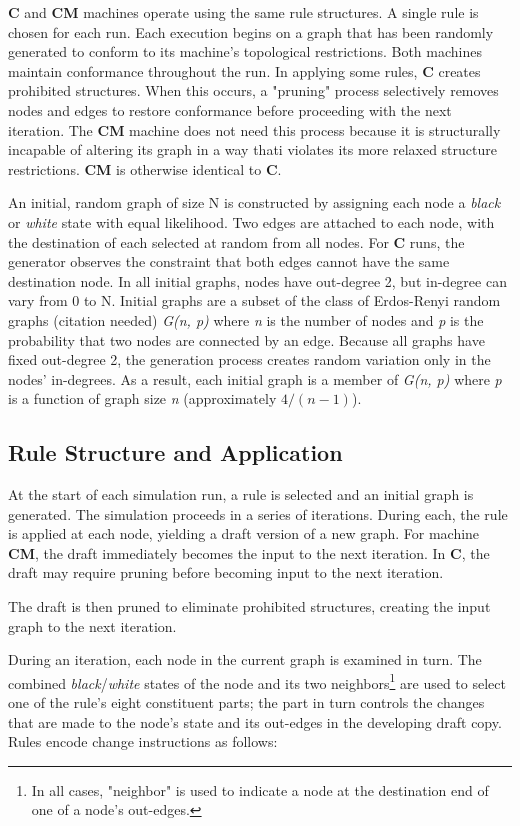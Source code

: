 \documentclass{tufte-handout}
\begin{document}
\textbf{C} and \textbf{CM} machines operate using the same rule structures.
A single rule is chosen for each run. Each execution
begins on a graph that has been randomly generated
to conform to its machine's topological restrictions. Both machines maintain conformance
throughout the run. In applying some rules, \textbf{C} creates prohibited
structures. When this occurs, a "pruning" process selectively
removes nodes and edges to restore conformance before proceeding with the
next iteration. The \textbf{CM} machine does not need this process because
it is structurally incapable of altering its graph in a way thati violates its more
relaxed structure restrictions. \textbf{CM} is otherwise identical to \textbf{C}.  

An initial, random graph of size N is constructed by assigning each node
a \textit{black} or \textit{white} state with equal likelihood.
Two edges are attached to each node, with
the destination of each selected at random from all nodes. For \textbf{C} runs, the
generator observes the constraint that both edges cannot have the same destination node.
In all initial graphs, nodes have out-degree 2, but in-degree can vary from 0 to N.
Initial graphs are a subset of the class of Erdos-Renyi random graphs (citation needed)
\textit{G(n, p)} where \textit{n} is the number of nodes and \textit{p} is the probability
that two nodes are connected by an edge. Because all graphs have fixed out-degree 2,
the generation process creates random variation only in the nodes' in-degrees. As a result,
each initial graph is a member of \textit{G(n, p)} where \textit{p} is a function
of graph size \textit{n} (approximately \( 4 / (n - 1) \)).

\subsection{Rule Structure and Application}

At the start of each simulation run, a rule is selected and an initial graph
is generated.  The simulation proceeds in a series of
iterations. During each, the rule is applied at each node, yielding a draft
version of a new graph. For machine \textbf{CM}, the draft immediately becomes
the input to the next iteration. In \textbf{C}, the draft may require pruning
before becoming input to the next iteration. 

The draft is then pruned to eliminate
prohibited structures, creating the input graph to the next iteration.

During an iteration, each node in the current graph is examined in turn.
The combined \textit{black}/\textit{white} states of the node and its two neighbors\footnote{In
all cases, "neighbor" is used to indicate a node at the destination end of one of a node's out-edges.}
are used to select one of the rule's eight constituent parts; the part in turn
controls the changes that are made to the node's state and its out-edges in
the developing draft copy. Rules encode change instructions as follows:
\end{document}
